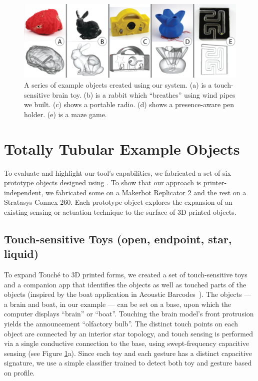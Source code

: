 \begin{figure}
\centering
    \includegraphics[width=7in]{figures/examples.png}
\caption{A series of example objects created using our system.  (a) is a touch-sensitive brain toy.  (b) is a rabbit which ``breathes'' using wind pipes we built.  (c) shows a portable radio.  (d) shows a presence-aware pen holder.  (e) is a maze game.}
\label{fig:examples}
\end{figure}

\section{Totally Tubular Example Objects}
To evaluate and highlight our tool's capabilities, we fabricated a set of six prototype objects designed using \systemnamenospace.  To show that our approach is printer-independent, we fabricated some on a Makerbot Replicator 2 and the rest on a Stratasys Connex 260.  Each prototype object explores the expansion of an existing sensing or actuation technique to the surface of 3D printed objects.

\subsection{Touch-sensitive Toys (open, endpoint, star, liquid)}

To expand Touch\'{e} \cite{Sato-touche} to 3D printed forms, we created a set of touch-sensitive toys and a companion app that identifies the objects as well as touched parts of the objects (inspired by the boat application in Acoustic Barcodes~\cite{Harrison-acoustic}). The objects --- a brain and boat, in our example --- can be set on a base, upon which the computer displays ``brain'' or ``boat''. Touching the brain model's front protrusion yields the announcement ``olfactory bulb''. The distinct touch points on each object are connected by an interior star topology, and touch sensing is performed via a single conductive connection to the base, using swept-frequency capacitive sensing (see Figure \ref{fig:examples}a). %
Since each toy and each gesture has a distinct capacitive signature, we use a simple classifier trained to detect both toy and gesture based on profile.

